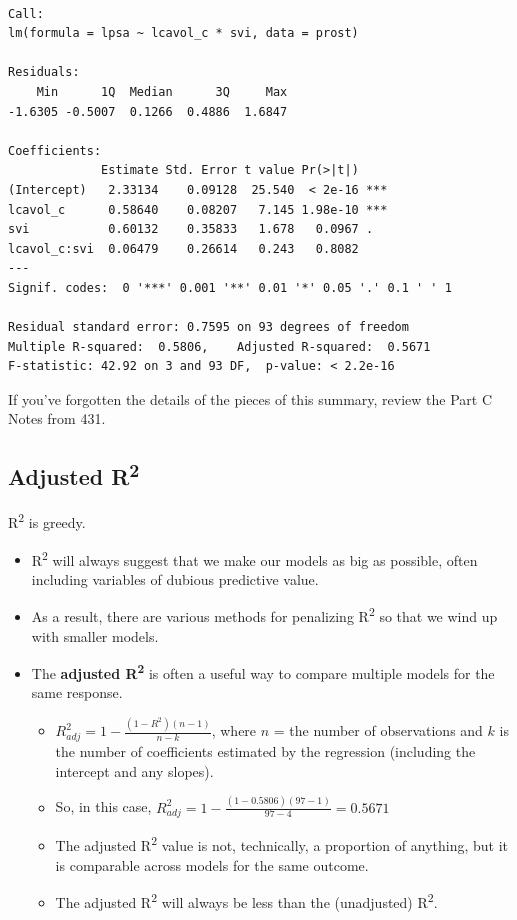 \documentclass[]{book}
\providecommand{\tightlist}{%
  \setlength{\itemsep}{0pt}\setlength{\parskip}{0pt}}
\theoremstyle{definition}
\theoremstyle{definition}
\theoremstyle{definition}
\theoremstyle{remark}
\begin{document}
\begin{verbatim}

Call:
lm(formula = lpsa ~ lcavol_c * svi, data = prost)

Residuals:
    Min      1Q  Median      3Q     Max 
-1.6305 -0.5007  0.1266  0.4886  1.6847 

Coefficients:
             Estimate Std. Error t value Pr(>|t|)    
(Intercept)   2.33134    0.09128  25.540  < 2e-16 ***
lcavol_c      0.58640    0.08207   7.145 1.98e-10 ***
svi           0.60132    0.35833   1.678   0.0967 .  
lcavol_c:svi  0.06479    0.26614   0.243   0.8082    
---
Signif. codes:  0 '***' 0.001 '**' 0.01 '*' 0.05 '.' 0.1 ' ' 1

Residual standard error: 0.7595 on 93 degrees of freedom
Multiple R-squared:  0.5806,    Adjusted R-squared:  0.5671 
F-statistic: 42.92 on 3 and 93 DF,  p-value: < 2.2e-16
\end{verbatim}

If you've forgotten the details of the pieces of this summary, review
the Part C Notes from 431.

\subsection{\texorpdfstring{Adjusted
R\textsuperscript{2}}{Adjusted R2}}\label{adjusted-r2}

R\textsuperscript{2} is greedy.

\begin{itemize}
\tightlist
\item
  R\textsuperscript{2} will always suggest that we make our models as
  big as possible, often including variables of dubious predictive
  value.
\item
  As a result, there are various methods for penalizing
  R\textsuperscript{2} so that we wind up with smaller models.
\item
  The \textbf{adjusted R\textsuperscript{2}} is often a useful way to
  compare multiple models for the same response.

  \begin{itemize}
  \tightlist
  \item
    \(R^2_{adj} = 1 - \frac{(1-R^2)(n - 1)}{n - k}\), where \(n\) = the
    number of observations and \(k\) is the number of coefficients
    estimated by the regression (including the intercept and any
    slopes).
  \item
    So, in this case,
    \(R^2_{adj} = 1 - \frac{(1 - 0.5806)(97 - 1)}{97 - 4} = 0.5671\)
  \item
    The adjusted R\textsuperscript{2} value is not, technically, a
    proportion of anything, but it is comparable across models for the
    same outcome.
  \item
    The adjusted R\textsuperscript{2} will always be less than the
    (unadjusted) R\textsuperscript{2}.
  \end{itemize}
\end{itemize}
\end{document}
